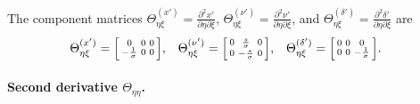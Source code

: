 \documentclass{article}
\begin{document}
%
The component matrices $\Theta_{\eta\xi}^{(x')} = \frac{\partial^2 x'}{\partial \eta \partial \xi}$, $\Theta_{\eta\xi}^{(\nu')} = \frac{\partial^2 \nu'}{\partial \eta \partial \xi}$, and $\Theta_{\eta\xi}^{(\delta')} = \frac{\partial^2 \delta'}{\partial \eta \partial \xi}$ are
%
\begin{align}
  \Theta_{\eta\xi}^{(x')}      & = \begin{bsmallmatrix} 0 & 0 & 0 \\ -\frac{1}{\sigma} & 0 & 0 \end{bsmallmatrix}, &
  \Theta_{\eta\xi}^{(\nu')}    & = \begin{bsmallmatrix} 0 & \frac{s}{\sigma} & 0 \\ 0 & -\frac{s}{\sigma} & 0 \end{bsmallmatrix}, &
  \Theta_{\eta\xi}^{(\delta')} & = \begin{bsmallmatrix} 0 & 0 & 0 \\ 0 & 0 & -\frac{1}{\sigma} \end{bsmallmatrix}.
\end{align}

\paragraph{Second derivative $\Theta_{\eta\eta}$.}
\end{document}
